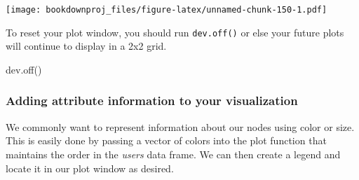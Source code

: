 \documentclass[
]{article}
\newenvironment{Shaded}{\begin{snugshade}}{\end{snugshade}}
\newcommand{\AttributeTok}[1]{\textcolor[rgb]{0.77,0.63,0.00}{#1}}
\newcommand{\DecValTok}[1]{\textcolor[rgb]{0.00,0.00,0.81}{#1}}
\newcommand{\FloatTok}[1]{\textcolor[rgb]{0.00,0.00,0.81}{#1}}
\newcommand{\FunctionTok}[1]{\textcolor[rgb]{0.00,0.00,0.00}{#1}}
\newcommand{\NormalTok}[1]{#1}
\newcommand{\SpecialCharTok}[1]{\textcolor[rgb]{0.00,0.00,0.00}{#1}}
\newcommand{\StringTok}[1]{\textcolor[rgb]{0.31,0.60,0.02}{#1}}
\theoremstyle{definition}
\theoremstyle{definition}
\theoremstyle{definition}
\theoremstyle{definition}
\theoremstyle{remark}
\begin{document}
\texttt{[image: bookdownproj\_files/figure-latex/unnamed-chunk-150-1.pdf]}

To reset your plot window, you should run \texttt{dev.off()} or else your future plots will continue to display in a 2x2 grid.

\begin{Shaded}
\begin{Highlighting}[]
\FunctionTok{dev.off}\NormalTok{()}
\end{Highlighting}
\end{Shaded}

\hypertarget{adding-attribute-information-to-your-visualization}{%
\subsubsection{Adding attribute information to your visualization}\label{adding-attribute-information-to-your-visualization}}

We commonly want to represent information about our nodes using color or size. This is easily done by passing a vector of colors into the plot function that maintains the order in the \emph{users} data frame. We can then create a legend and locate it in our plot window as desired.

\begin{Shaded}
\end{Shaded}
\end{document}
